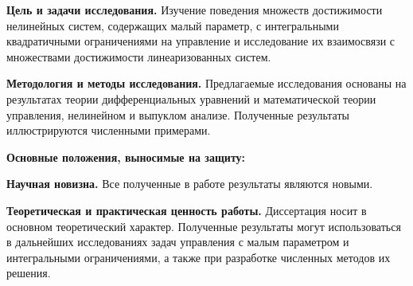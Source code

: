 \textbf{Цель и задачи исследования.} Изучение поведения множеств достижимости нелинейных систем, содержащих малый параметр, с интегральными  квадратичными ограничениями на управление и исследование их взаимосвязи с множествами достижимости линеаризованных систем.

\textbf{Методология и методы исследования.} Предлагаемые исследования основаны на результатах теории дифференциальных уравнений и математической теории управления, нелинейном и выпуклом анализе.
Полученные результаты иллюстрируются численными примерами.

\textbf{Основные положения, выносимые на защиту:} 



\textbf{Научная новизна.} Все полученные в работе результаты являются новыми.

\textbf{Теоретическая и практическая ценность работы.} Диссертация носит в основном теоретический характер.
Полученные результаты могут использоваться в дальнейших исследованиях задач управления с малым параметром и интегральными ограничениями, а также при разработке численных методов их решения.

